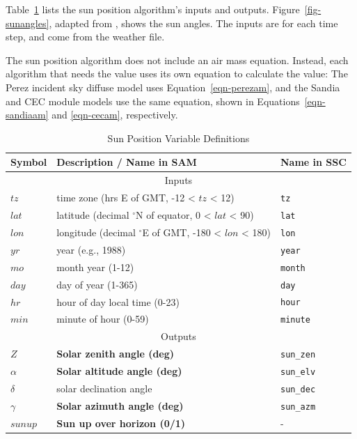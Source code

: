 \documentclass[12pt,letterpaper]{article}
\begin{document}
Table~\ref{tab-sunposvars} lists the sun position algorithm's inputs and outputs. Figure~\ref{fig-sunangles}, adapted from \citet{dunlap2007}, shows the sun angles. The inputs are for each time step, and come from the weather file. 

The sun position algorithm does not include an air mass equation. Instead, each algorithm that needs the value uses its own equation to calculate the value: The Perez incident sky diffuse model uses Equation~\ref{eqn-perezam}, and the Sandia and CEC module models use the same equation, shown in Equations~\ref{eqn-sandiaam} and \ref{eqn-cecam}, respectively. 

\begin{table}
\begin{center}
\caption{Sun Position Variable Definitions}
\begin{tabular}{lll}
\midrule
Symbol & Description / \textbf{Name in SAM} & Name in SSC\\
\midrule
\multicolumn{3}{c}{Inputs}\\
$\mathit{tz}$ & time zone (hrs E of GMT, -12 < $tz$ < 12) & \texttt{tz}\\
$\mathit{lat}$ & latitude (decimal $^\circ$N of equator, 0 < $lat$ < 90) & \texttt{lat}\\
$\mathit{lon}$ & longitude (decimal $^\circ$E of GMT, -180 < $lon$ < 180) & \texttt{lon}\\
$\mathit{yr}$ & year (e.g., 1988) & \texttt{year}\\
$\mathit{mo}$ & month year (1-12) & \texttt{month}\\
$\mathit{day}$ & day of year (1-365) & \texttt{day}\\
$\mathit{hr}$ & hour of day local time (0-23) & \texttt{hour}\\
$\mathit{min}$ & minute of hour (0-59) & \texttt{minute}\\
\midrule
\multicolumn{3}{c}{Outputs}\\
$Z$ & \textbf{Solar zenith angle (deg)} & \texttt{sun\_zen}\\
$\alpha$ & \textbf{Solar altitude angle (deg)} & \texttt{sun\_elv}\\
$\delta$ & solar declination angle & \texttt{sun\_dec}\\
$\gamma$ & \textbf{Solar azimuth angle (deg)} & \texttt{sun\_azm}\\
$\mathit{sunup}$ & \textbf{Sun up over horizon (0/1)} & -\\
\midrule
\end{tabular}
\label{tab-sunposvars}
\end{center}
\end{table}
\end{document}
